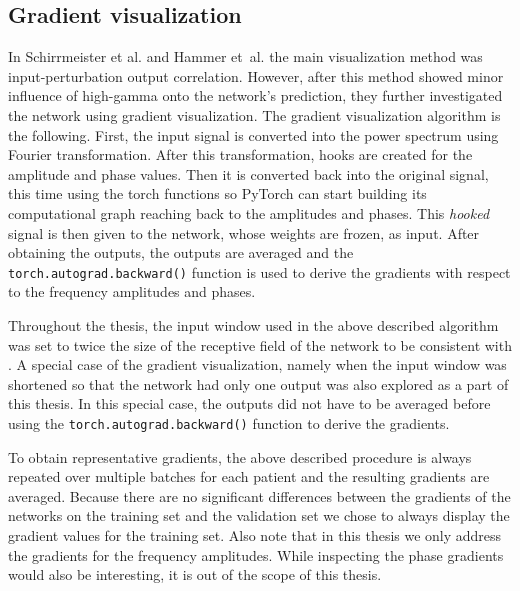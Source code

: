 \subsection{Gradient visualization}\label{subsec:gradinet-visualization}
In Schirrmeister et al. and Hammer et\ al. the main visualization method was input-perturbation output correlation.
However, after this method showed minor influence of high-gamma onto the network's prediction, they further investigated the network using gradient visualization.
The gradient visualization algorithm is the following.
First, the input signal is converted into the power spectrum using Fourier transformation.
After this transformation, hooks are created for the amplitude and phase values.
Then it is converted back into the original signal, this time using the torch functions so PyTorch can start building its computational graph reaching back to the amplitudes and phases.
This \textit{hooked} signal is then given to the network, whose weights are frozen, as input.
After obtaining the outputs, the outputs are averaged and the \texttt{torch.autograd.backward()} function is used to derive the gradients with respect to the frequency amplitudes and phases.

Throughout the thesis, the input window used in the above described algorithm was set to twice the size of the receptive field of the network to be consistent with \cite{Hammer_2021}.
A special case of the gradient visualization, namely when the input window was shortened so that the network had only one output was also explored as a part of this thesis.
In this special case, the outputs did not have to be averaged before using the \texttt{torch.autograd.backward()} function to derive the gradients.

To obtain representative gradients, the above described procedure is always repeated over multiple batches for each patient and the resulting gradients are averaged.
Because there are no significant differences between the gradients of the networks on the training set and the validation set we chose to always display the gradient values for the training set.
Also note that in this thesis we only address the gradients for the frequency amplitudes.
While inspecting the phase gradients would also be interesting, it is out of the scope of this thesis.


